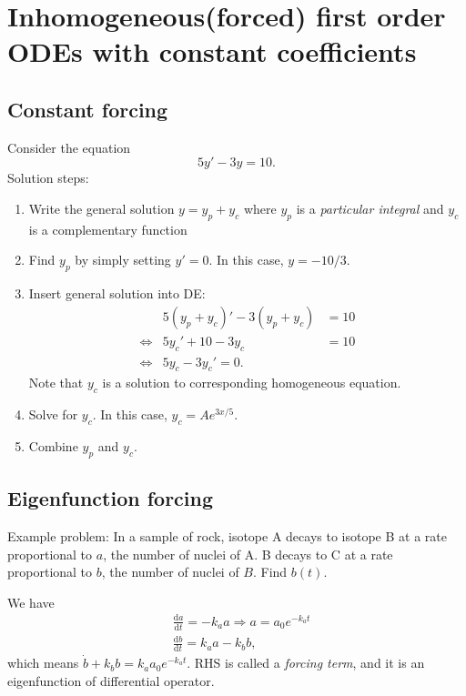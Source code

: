 \documentclass[10pt]{article}
\begin{document}
    \section{Inhomogeneous(forced) first order ODEs with constant coefficients}
    \subsection{Constant forcing}
    \begin{example}
        Consider the equation 
        \[
            5y'-3y=10
        .\]
        Solution steps:
        \begin{enumerate}
            \item Write the general solution $ y=y_p+y_c $ where $y_p$ is a \textit{particular integral} and $y_c$ is a complementary function
            \item Find $ y_p $ by simply setting $y'=0$. In this case, $y=-10/3$.
            \item Insert general solution into DE:
            \[
              \begin{aligned}
                   &5(y_p+y_c)'-3(y_p+y_c)&=10\\
                   \Longleftrightarrow & 5y_c'+10-3y_c&=10\\
                    \Longleftrightarrow & 5y_c-3y_c'=0.
              \end{aligned}  
            \]
            Note that $ y_c $ is a solution to corresponding homogeneous equation.
            \item Solve for $y_c$. In this case, $y_c=Ae^{3x/5}$.
            \item Combine $y_p$ and $y_c$.
        \end{enumerate}
    \end{example}
    \subsection{Eigenfunction forcing}
    Example problem: In a sample of rock, isotope A decays to isotope B at a rate proportional to $a$, the number of nuclei of A. B decays to C at a rate proportional to $b$, the number of nuclei of $B$. Find $b(t)$.
    
    We have 
    \[
        \begin{aligned}
            &\frac{\mathrm{d}a}{\mathrm{d}t} = -k_a a \Longrightarrow  a = a_0 e^{-k_a t}\\
            &\frac{\mathrm{d}b}{\mathrm{d}t} = k_a a -k_b b, 
        \end{aligned}
    \]
    which means $ \dot{b}+k_b b=k_a a_0 e^{-k_a t} $. RHS is called a \textit{forcing term}, and it is an eigenfunction of differential operator.
\end{document}
